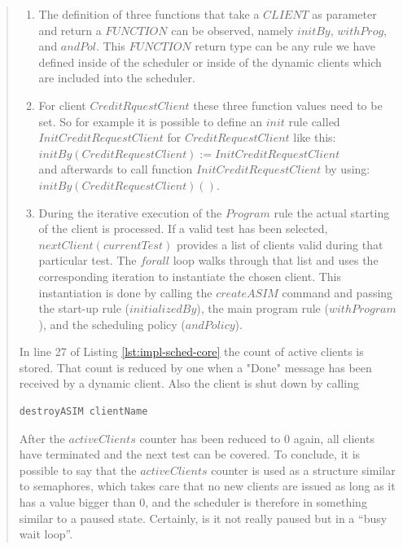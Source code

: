 \begin{quote}
\begin{enumerate}
\item The definition of three functions that take a $CLIENT$ as parameter and return a $FUNCTION$ can be observed, namely $initBy$, $withProg$, and $andPol$. This $FUNCTION$ return type can be any rule we have defined inside of the scheduler or inside of the dynamic clients which are included into the scheduler.
\item For client $CreditRquestClient$ these three function values need to be set. So for example it is possible to define an $init$ rule called $InitCreditRequestClient$ for $CreditRequestClient$ like this: \\
\hspace*{1cm}$initBy(CreditRequestClient) := InitCreditRequestClient$\\
and afterwards to call function $InitCreditRequestClient$ by using:\\
\hspace*{1cm}$initBy(CreditRequestClient)()$.
\item During the iterative execution of the $Program$ rule the actual starting of the client is processed. If a valid test has been selected, $nextClient(currentTest)$ provides a list of clients valid during that particular test. The $forall$ loop walks through that list and uses the corresponding iteration to instantiate the chosen client. This instantiation is done by calling the $createASIM$ command and passing the start-up rule ($initializedBy$), the main program rule ($withProgram$), and the scheduling policy ($andPolicy$).
\end{enumerate}


In line 27 of Listing \ref{lst:impl-sched-core} the count of active clients is stored. That count is reduced by one when a "Done" message has been received by a dynamic client. Also the client is shut down by calling

\begin{lstlisting}[language=bsl]
	destroyASIM clientName
\end{lstlisting}

After the $activeClients$ counter has been reduced to $0$ again, all clients have terminated and the next test can be covered. To conclude, it is possible to say that the $activeClients$ counter is used as a structure similar to semaphores, which takes care that no new clients are issued as long as it has a value bigger than $0$, and the scheduler is therefore in something similar to a paused state. Certainly, is it not really paused but in a ``busy wait loop''.

\end{quote}

